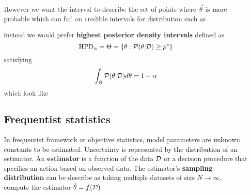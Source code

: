 \documentclass[../../main.tex]{subfiles}
\begin{document}
However we want the interval to describe the set of points where $\vec{\theta}$ is more probable which can fail on credible intervals for distribution such as
\begin{figure}[H]
    \centering
\end{figure}
instead we would prefer \textbf{highest posterior density intervals} defined as
\begin{equation*}
    \mathrm{HPD}_\alpha=\Theta= \{ \theta: \mathcal{P}(\theta|\mathcal{D})\ge p^* \}
\end{equation*}
satisfying
\begin{equation*}
    \int_\Theta\mathcal{P}(\theta|\mathcal{D})d\theta=1-\alpha
\end{equation*}
which look like 
\begin{figure}[H]
    \centering
\end{figure}

\subsection{Frequentist statistics}
In frequentist framework or objective statistics, model parameters are unknown constants to be estimated. Uncertainty is represented by the distribution of an estimator. An \textbf{estimator} is a function of the data $\mathcal{D}$ or a decision procedure that specifies an action based on observed data. The estimator's \textbf{sampling distribution} can be describe as taking multiple datasets of size $N\rightarrow\infty$, compute the estimator $\hat{\theta}=f(\mathcal{D})$
\end{document}
